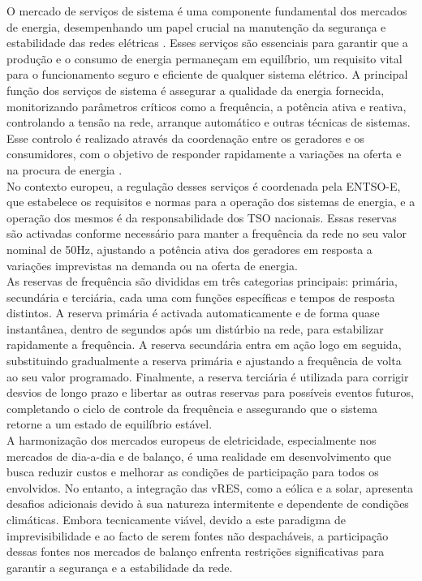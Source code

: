 O mercado de serviços de sistema é uma componente fundamental dos mercados de energia, desempenhando um papel crucial na manutenção da segurança e estabilidade das redes elétricas \cite{dgegmss}. Esses serviços são essenciais para garantir que a produção e o consumo de energia permaneçam em equilíbrio, um requisito vital para o funcionamento seguro e eficiente de qualquer sistema elétrico. A principal função dos serviços de sistema é assegurar a qualidade da energia fornecida, monitorizando parâmetros críticos como a frequência, a potência ativa e reativa, controlando a tensão na rede, arranque automático e outras técnicas de sistemas. Esse controlo é realizado através da coordenação entre os geradores e os consumidores, com o objetivo de responder rapidamente a variações na oferta e na procura de energia \cite{Rassid2017} \cite{Carneiro2016}.\\
No contexto europeu, a regulação desses serviços é coordenada pela \gls{ENTSO-E}, que estabelece os requisitos e normas para a operação dos sistemas de energia, e a operação dos mesmos é da responsabilidade dos \gls{TSO} nacionais. Essas reservas são activadas conforme necessário para manter a frequência da rede no seu valor nominal de 50Hz, ajustando a potência ativa dos geradores em resposta a variações imprevistas na demanda ou na oferta de energia.\\
As reservas de frequência são divididas em três categorias principais: primária, secundária e terciária, cada uma com funções específicas e tempos de resposta distintos. A reserva primária é activada automaticamente e de forma quase instantânea, dentro de segundos após um distúrbio na rede, para estabilizar rapidamente a frequência. A reserva secundária entra em ação logo em seguida, substituindo gradualmente a reserva primária e ajustando a frequência de volta ao seu valor programado. Finalmente, a reserva terciária é utilizada para corrigir desvios de longo prazo e libertar as outras reservas para possíveis eventos futuros, completando o ciclo de controle da frequência e assegurando que o sistema retorne a um estado de equilíbrio estável.\\
A harmonização dos mercados europeus de eletricidade, especialmente nos mercados de dia-a-dia e de balanço, é uma realidade em desenvolvimento que busca reduzir custos e melhorar as condições de participação para todos os envolvidos. No entanto, a integração das \gls{vRES}, como a eólica e a solar, apresenta desafios adicionais devido à sua natureza intermitente e dependente de condições climáticas. Embora tecnicamente viável, devido a este paradigma de imprevisibilidade e ao facto de serem fontes não despacháveis, a participação dessas fontes nos mercados de balanço enfrenta restrições significativas para garantir a segurança e a estabilidade da rede.\\
